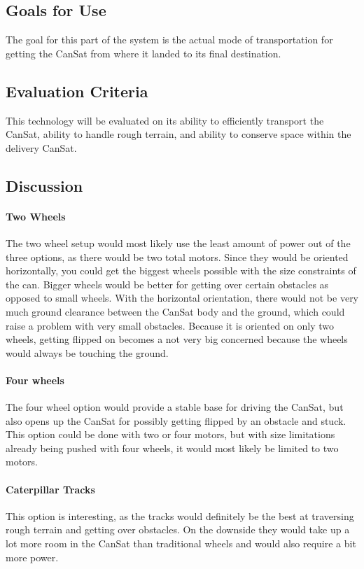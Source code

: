 \documentclass[10pt,letterpaper,onecolumn,journal]{IEEEtran}
\begin{document}
\subsection{Goals for Use}
The goal for this part of the system is the actual mode of transportation for getting the CanSat from where it landed to its final destination.
\subsection{Evaluation Criteria}
This technology will be evaluated on its ability to efficiently transport the CanSat, ability to handle rough terrain, and ability to conserve space within the delivery CanSat.
\subsection{Discussion}
\paragraph{Two Wheels}
The two wheel setup would most likely use the least amount of power out of the three options, as there would be two total motors. Since they would be oriented horizontally, you could get the biggest wheels possible with the size constraints of the can. Bigger wheels would be better for getting over certain obstacles as opposed to small wheels. With the horizontal orientation, there would not be very much ground clearance between the CanSat body and the ground, which could raise a problem with very small obstacles. Because it is oriented on only two wheels, getting flipped on becomes a not very big concerned because the wheels would always be touching the ground.
\paragraph{Four wheels}
The four wheel option would provide a stable base for driving the CanSat, but also opens up the CanSat for possibly getting flipped by an obstacle and stuck. This option could be done with two or four motors, but with size limitations already being pushed with four wheels, it would most likely be limited to two motors.
\paragraph{Caterpillar Tracks}
This option is interesting, as the tracks would definitely be the best at traversing rough terrain and getting over obstacles. On the downside they would take up a lot more room in the CanSat than traditional wheels and would also require a bit more power.
\end{document}
